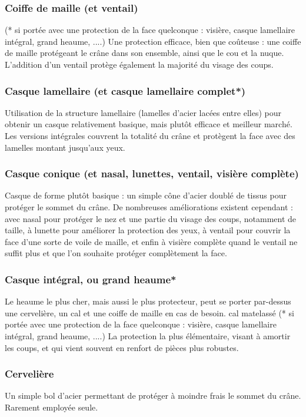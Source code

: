 \documentclass[10pt,a4paper,twocolumn]{book}
\begin{document}
\subsubsection{Coiffe de maille (et ventail)}
 (* si portée avec une protection de la face quelconque : visière, casque lamellaire intégral, grand heaume, ....)
Une protection efficace, bien que coûteuse : une coiffe de maille protégeant le crâne dans son ensemble, ainsi que le cou et la nuque. L'addition d'un ventail protège également la majorité du visage des coups.
\subsubsection{Casque lamellaire (et casque lamellaire complet*)}
Utilisation de la structure lamellaire (lamelles d'acier lacées entre elles) pour obtenir un casque relativement basique, mais plutôt efficace et meilleur marché. Les versions intégrales couvrent la totalité du crâne et protègent la face avec des lamelles montant jusqu'aux yeux.
\subsubsection{Casque conique (et nasal, lunettes, ventail, visière complète)}
Casque de forme plutôt basique : un simple cône d'acier doublé de tissus pour protéger le sommet du crâne. De nombreuses améliorations existent cependant : avec nasal pour protéger le nez et une partie du visage des coups, notamment de taille, à lunette pour améliorer la protection des yeux, à ventail pour couvrir la face d'une sorte de voile de maille, et enfin à visière complète quand le ventail ne suffit plus et que l'on souhaite protéger complètement la face.
\subsubsection{Casque intégral, ou grand heaume*}
Le heaume le plus cher, mais aussi le plus protecteur, peut se porter par-dessus une cervelière, un cal et une coiffe de maille en cas de besoin.
cal matelassé
(* si portée avec une protection de la face quelconque : visière, casque lamellaire intégral, grand heaume, ....)
La protection la plus élémentaire, visant à amortir les coups, et qui vient souvent en renfort de pièces plus robustes.
\subsubsection{Cervelière}
Un simple bol d'acier permettant de protéger à moindre frais le sommet du crâne. Rarement employée seule.
\end{document}
